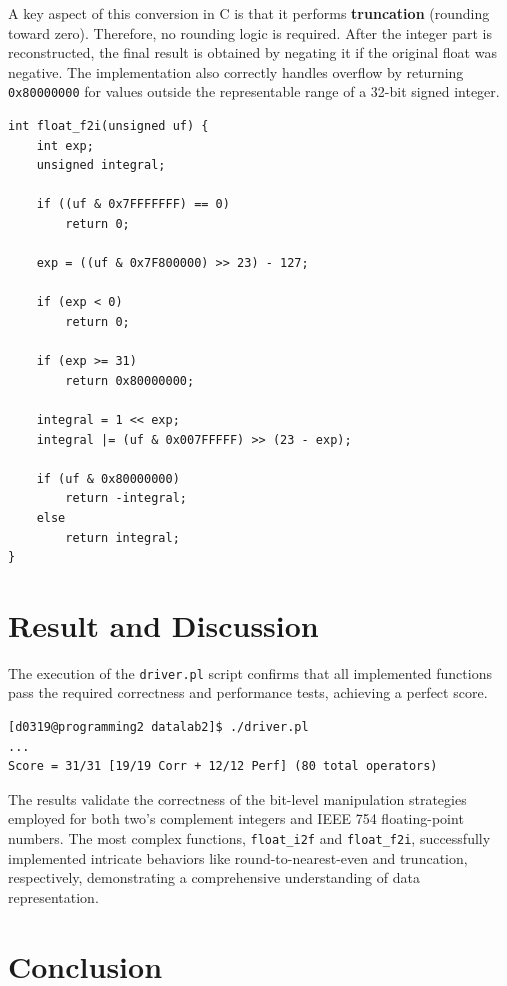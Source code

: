 \documentclass{article}
\begin{document}
A key aspect of this conversion in C is that it performs \textbf{truncation} 
(rounding toward zero). Therefore, no rounding logic is required. After the 
integer part is reconstructed, the final result is obtained by negating it if 
the original float was negative. The implementation also correctly handles 
overflow by returning \texttt{0x80000000} for values outside the representable 
range of a 32-bit signed integer.

\begin{verbatim}
int float_f2i(unsigned uf) {
    int exp;
    unsigned integral;

    if ((uf & 0x7FFFFFFF) == 0)
        return 0;

    exp = ((uf & 0x7F800000) >> 23) - 127;

    if (exp < 0)
        return 0;

    if (exp >= 31)
        return 0x80000000;

    integral = 1 << exp;
    integral |= (uf & 0x007FFFFF) >> (23 - exp);

    if (uf & 0x80000000)
        return -integral;
    else
        return integral;
}
\end{verbatim}

\section{Result and Discussion}

The execution of the \verb|driver.pl| script confirms that all implemented
functions pass the required correctness and performance tests, achieving a
perfect score.

\begin{verbatim}
[d0319@programming2 datalab2]$ ./driver.pl
...
Score = 31/31 [19/19 Corr + 12/12 Perf] (80 total operators)
\end{verbatim}

The results validate the correctness of the bit-level manipulation strategies 
employed for both two's complement integers and IEEE 754 floating-point numbers. 
The most complex functions, \texttt{float\_i2f} and \texttt{float\_f2i}, 
successfully implemented intricate behaviors like round-to-nearest-even and 
truncation, respectively, demonstrating a comprehensive understanding of data 
representation.

\section{Conclusion}
\end{document}
